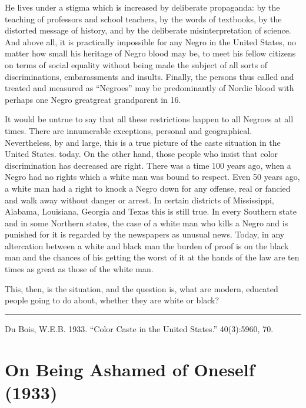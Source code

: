 \documentclass[letterpaper,10pt,english]{jupyterBook}
\begin{document}
\sphinxAtStartPar
He lives under a stigma which is increased by deliberate propaganda: by the teaching of professors and school teachers, by the words of textbooks, by the distorted message of history, and by the deliberate misinterpretation of science. And above all, it is practically impossible for any Negro in the United States, no matter how small his heritage of Negro blood may be, to meet his fellow citizens on terms of social equality without being made the subject of all sorts of discriminations, embarassments and insults. Finally, the persons thus called and treated and measured as “Negroes” may be predominantly of Nordic blood with perhaps one Negro great\sphinxhyphen{}great grandparent in 16.

\sphinxAtStartPar
It would be untrue to say that all these restrictions happen to all Negroes at all times. There are innumerable exceptions, personal and geographical. Nevertheless, by and large, this is a true picture of the caste situation in the United States. today. On the other hand, those people who insist that color discrimination has decreased are right. There was a time 100 years ago, when a Negro had no rights which a white man was bound to respect. Even 50 years ago, a white man had a right to knock a Negro down for any offense, real or fancied and walk away without danger or arrest. In certain districts of Mississippi, Alabama, Louisiana, Georgia and Texas this is still true. In every Southern state and in some Northern states, the case of a white man who kills a Negro and is punished for it is regarded by the newspapers as unusual news. Today, in any altercation between a white and black man the burden of proof is on the black man and the chances of his getting the worst of it at the hands of the law are ten times as great as those of the white man.

\sphinxAtStartPar
This, then, is the situation, and the question is, what are modern, educated people going to do about, whether they are white or black?


\bigskip\hrule\bigskip


\sphinxAtStartPar
{} Du Bois, W.E.B. 1933. “Color Caste in the United States.”   40(3):59\sphinxhyphen{}60, 70.


\section{On Being Ashamed of Oneself (1933)}
\label{\detokenize{Volumes/40/09/on_being_ashamed:on-being-ashamed-of-oneself-1933}}\label{\detokenize{Volumes/40/09/on_being_ashamed::doc}}
\sphinxAtStartPar
{}
\end{document}
